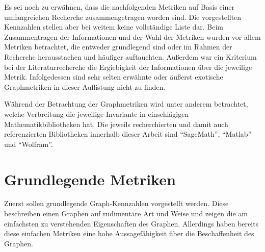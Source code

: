 \documentclass[a4paper,12pt,ngerman,chapterprefix=false,listof=totoc,bibliography=totoc]{scrreprt}
\begin{document}
{Es sei noch zu erwähnen, dass die nachfolgenden Metriken auf Basis einer umfangreichen Recherche zusammengetragen worden sind. Die vorgestellten Kennzahlen stellen aber bei weitem keine vollständige Liste dar. Beim Zusammentragen der Informationen und der Wahl der Metriken wurden vor allem Metriken betrachtet, die entweder grundlegend sind oder im Rahmen der Recherche herausstachen und häufiger auftauchten. Außerdem war ein Kriterium bei der Literaturrecherche die Ergiebigkeit der Informationen über die jeweilige Metrik. Infolgedessen sind sehr selten erwähnte oder äußerst exotische Graphmetriken in dieser Auflistung nicht zu finden.

Während der Betrachtung der Graphmetriken wird unter anderem betrachtet, welche Verbreitung die jeweilige Invariante in einschlägigen Mathematikbibliotheken hat. Die jeweils recherchierten und damit auch referenzierten Bibliotheken innerhalb dieser Arbeit sind "`SageMath"', "`Matlab"' und "`Wolfram"'.
}
\section{Grundlegende Metriken}
{
Zuerst sollen grundlegende Graph-Kennzahlen vorgestellt werden. Diese beschreiben einen Graphen auf rudimentäre Art und Weise und zeigen die am einfachsten zu verstehenden Eigenschaften des Graphen. Allerdings haben bereits diese einfachen Metriken eine hohe Aussagefähigkeit über die Beschaffenheit des Graphen.
}
\end{document}
